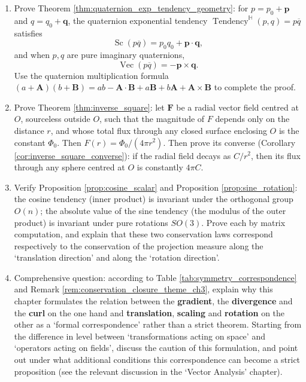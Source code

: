 \begin{enumerate}[leftmargin=3em, label=\textbf{Exercise \arabic*}]
    \item Prove Theorem \ref{thm:quaternion_exp_tendency_geometry}:
    for $p=p_0+\mathbf{p}$ and $q=q_0+\mathbf{q}$, the quaternion exponential tendency
    $\operatorname{Tendency}^{\mathbb{H}}(p,q)=p\overline{q}$ satisfies
    \[
    \operatorname{Sc}(p\overline{q})=p_0q_0+\mathbf{p}\cdot\mathbf{q},
    \]
    and when $p,q$ are pure imaginary quaternions,
    \[
    \operatorname{Vec}(p\overline{q})=-\mathbf{p}\times\mathbf{q}.
    \]
    Use the quaternion multiplication formula
    $(a+\mathbf{A})(b+\mathbf{B})=ab-\mathbf{A}\cdot\mathbf{B}+a\mathbf{B}+b\mathbf{A}+\mathbf{A}\times\mathbf{B}$
    to complete the proof.

    \item Prove Theorem \ref{thm:inverse_square}:
    let $\mathbf{F}$ be a radial vector field centred at $O$, sourceless outside $O$,
    such that the magnitude of $F$ depends only on the distance $r$, and whose total flux through any closed surface enclosing $O$ is the constant $\Phi_0$.
    Then $F(r)=\Phi_0/(4\pi r^2)$.
    Then prove its converse (Corollary \ref{cor:inverse_square_converse}):
    if the radial field decays as $C/r^2$, then its flux through any sphere centred at $O$ is constantly $4\pi C$.

    \item Verify Proposition \ref{prop:cosine_scalar} and Proposition \ref{prop:sine_rotation}:
    the cosine tendency (inner product) is invariant under the orthogonal group $O(n)$;
    the absolute value of the sine tendency (the modulus of the outer product) is invariant under pure rotations $SO(3)$.
    Prove each by matrix computation, and explain that these two conservation laws correspond respectively to the conservation of the projection measure along the `translation direction' and along the `rotation direction'.

    \item Comprehensive question: according to Table \ref{tab:symmetry_correspondence} and Remark \ref{rem:conservation_closure_theme_ch3},
    explain why this chapter formulates the relation between the \textbf{gradient}, the \textbf{divergence} and the \textbf{curl} on the one hand
    and \textbf{translation}, \textbf{scaling} and \textbf{rotation} on the other as a `formal correspondence' rather than a strict theorem.
    Starting from the difference in level between `transformations acting on space' and `operators acting on fields',
    discuss the caution of this formulation, and point out under what additional conditions this correspondence can become a strict proposition
    (see the relevant discussion in the `Vector Analysis' chapter).
\end{enumerate}

